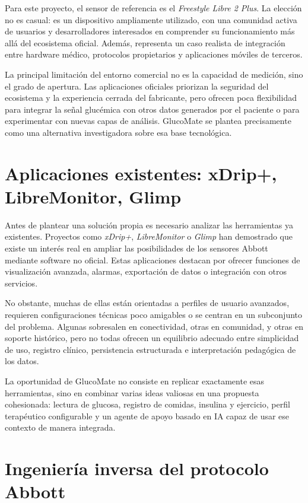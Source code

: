 Para este proyecto, el sensor de referencia es el \textit{Freestyle Libre 2 Plus}. La
elección no es casual: es un dispositivo ampliamente utilizado, con una comunidad activa
de usuarios y desarrolladores interesados en comprender su funcionamiento más allá del
ecosistema oficial. Además, representa un caso realista de integración entre hardware
médico, protocolos propietarios y aplicaciones móviles de terceros.

La principal limitación del entorno comercial no es la capacidad de medición, sino el
grado de apertura. Las aplicaciones oficiales priorizan la seguridad del ecosistema y la
experiencia cerrada del fabricante, pero ofrecen poca flexibilidad para integrar la señal
glucémica con otros datos generados por el paciente o para experimentar con nuevas capas
de análisis. GlucoMate se plantea precisamente como una alternativa investigadora sobre
esa base tecnológica.

\section{Aplicaciones existentes: xDrip+, LibreMonitor, Glimp}

Antes de plantear una solución propia es necesario analizar las herramientas ya
existentes. Proyectos como \textit{xDrip+}, \textit{LibreMonitor} o \textit{Glimp} han
demostrado que existe un interés real en ampliar las posibilidades de los sensores Abbott
mediante software no oficial. Estas aplicaciones destacan por ofrecer funciones de
visualización avanzada, alarmas, exportación de datos o integración con otros servicios.

No obstante, muchas de ellas están orientadas a perfiles de usuario avanzados, requieren
configuraciones técnicas poco amigables o se centran en un subconjunto del problema.
Algunas sobresalen en conectividad, otras en comunidad, y otras en soporte histórico, pero
no todas ofrecen un equilibrio adecuado entre simplicidad de uso, registro clínico,
persistencia estructurada e interpretación pedagógica de los datos.

La oportunidad de GlucoMate no consiste en replicar exactamente esas herramientas, sino
en combinar varias ideas valiosas en una propuesta cohesionada: lectura de glucosa,
registro de comidas, insulina y ejercicio, perfil terapéutico configurable y un agente de
apoyo basado en IA capaz de usar ese contexto de manera integrada.

\section{Ingeniería inversa del protocolo Abbott}

